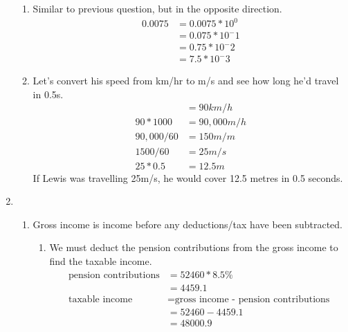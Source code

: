 \documentclass[11pt]{article}
\begin{document}
\begin{enumerate}
\begin{enumerate}
            \item Similar to previous question, but in the opposite direction.
            \begin{equation*}
                \begin{split}
                    0.0075&=0.0075*10^0\\
                    &=0.075*10^-1\\
                    &=0.75*10^-2\\
                    &=7.5*10^-3
                \end{split}
            \end{equation*}
            
            \item Let's convert his speed from km/hr to m/s and see how long he'd travel in 0.5s.
            \begin{equation*}
                \begin{split}
                    &=90 km/h\\
                    90*1000&=90,000 m/h\\
                    90,000/60&= 150 m/m\\
                    1500/60&= 25m/s\\
                    25 * 0.5&= 12.5m
                \end{split}
            \end{equation*}
            If Lewis was travelling 25m/s, he would cover 12.5 metres in 0.5 seconds.
        \end{enumerate}

    \pagebreak
    \item
        \begin{enumerate}
            \item Gross income is income before any deductions/tax have been subtracted.
                \begin{enumerate}
                    \item We must deduct the pension contributions from the gross income to find the taxable income.
                        \begin{equation*}
                            \begin{split}
                                \text{pension contributions}&=52460*8.5\%\\
                                &=4459.1\\
                                \text{taxable income }&=\text{gross income - pension contributions}\\
                                &=52460-4459.1\\
                                &=48000.9\\
                            \end{split}
                        \end{equation*}
                        

\end{enumerate}
\end{enumerate}
\end{enumerate}
\end{document}
